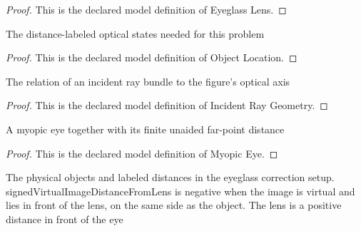 \begin{proof}
  This is the declared model definition of Eyeglass Lens.
\end{proof}
\begin{definition}
  \label{def:physics:phyx-mini-0045:phyxminiproblems-problemphyxmini0045-objectlocation}
  The distance-labeled optical states needed for this problem
\end{definition}
\begin{proof}
  This is the declared model definition of Object Location.
\end{proof}
\begin{definition}
  \label{def:physics:phyx-mini-0045:phyxminiproblems-problemphyxmini0045-incidentraygeometry}
  The relation of an incident ray bundle to the figure's optical axis
\end{definition}
\begin{proof}
  This is the declared model definition of Incident Ray Geometry.
\end{proof}
\begin{definition}
  \label{def:physics:phyx-mini-0045:phyxminiproblems-problemphyxmini0045-myopiceye}
  A myopic eye together with its finite unaided far-point distance
\end{definition}
\begin{proof}
  This is the declared model definition of Myopic Eye.
\end{proof}
\begin{definition}
  \label{def:physics:phyx-mini-0045:phyxminiproblems-problemphyxmini0045-eyeglasscorrectionsetup}
  The physical objects and labeled distances in the eyeglass correction setup. signedVirtualImageDistanceFromLens is negative when the image is virtual and lies in front of the lens, on the same side as the object. The lens is a positive distance in front of the eye
\end{definition}
